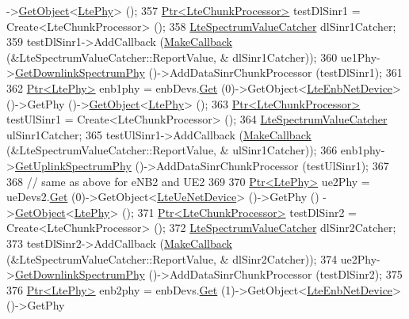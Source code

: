 \begin{DoxyCode}
      ->\hyperlink{classns3_1_1Object_a13e18c00017096c8381eb651d5bd0783}{GetObject}<\hyperlink{classns3_1_1LtePhy}{LtePhy}> ();
357   \hyperlink{classns3_1_1Ptr}{Ptr<LteChunkProcessor>} testDlSinr1 = Create<LteChunkProcessor> ();
358   \hyperlink{classns3_1_1LteSpectrumValueCatcher}{LteSpectrumValueCatcher} dlSinr1Catcher;
359   testDlSinr1->AddCallback (\hyperlink{group__makecallbackmemptr_ga9376283685aa99d204048d6a4b7610a4}{MakeCallback} (&LteSpectrumValueCatcher::ReportValue, &
      dlSinr1Catcher));
360   ue1Phy->\hyperlink{classns3_1_1LtePhy_a9560f8862545c7c5760e7f6737c5b938}{GetDownlinkSpectrumPhy} ()->AddDataSinrChunkProcessor (testDlSinr1);
361 
362   \hyperlink{classns3_1_1Ptr}{Ptr<LtePhy>} enb1phy = enbDevs.\hyperlink{classns3_1_1NetDeviceContainer_a677d62594b5c9d2dea155cc5045f4d0b}{Get} (0)->GetObject<\hyperlink{classns3_1_1LteEnbNetDevice}{LteEnbNetDevice}> ()->GetPhy
       ()->\hyperlink{classns3_1_1Object_a13e18c00017096c8381eb651d5bd0783}{GetObject}<\hyperlink{classns3_1_1LtePhy}{LtePhy}> ();
363   \hyperlink{classns3_1_1Ptr}{Ptr<LteChunkProcessor>} testUlSinr1 = Create<LteChunkProcessor> ();
364   \hyperlink{classns3_1_1LteSpectrumValueCatcher}{LteSpectrumValueCatcher} ulSinr1Catcher;
365   testUlSinr1->AddCallback (\hyperlink{group__makecallbackmemptr_ga9376283685aa99d204048d6a4b7610a4}{MakeCallback} (&LteSpectrumValueCatcher::ReportValue, &
      ulSinr1Catcher));
366   enb1phy->\hyperlink{classns3_1_1LtePhy_aa17612c41d80653ed556431eedef4304}{GetUplinkSpectrumPhy} ()->AddDataSinrChunkProcessor (testUlSinr1);
367 
368   \textcolor{comment}{// same as above for eNB2 and UE2}
369 
370   \hyperlink{classns3_1_1Ptr}{Ptr<LtePhy>} ue2Phy = ueDevs2.\hyperlink{classns3_1_1NetDeviceContainer_a677d62594b5c9d2dea155cc5045f4d0b}{Get} (0)->GetObject<\hyperlink{classns3_1_1LteUeNetDevice}{LteUeNetDevice}> ()->GetPhy ()
      ->\hyperlink{classns3_1_1Object_a13e18c00017096c8381eb651d5bd0783}{GetObject}<\hyperlink{classns3_1_1LtePhy}{LtePhy}> ();
371   \hyperlink{classns3_1_1Ptr}{Ptr<LteChunkProcessor>} testDlSinr2 = Create<LteChunkProcessor> ();
372   \hyperlink{classns3_1_1LteSpectrumValueCatcher}{LteSpectrumValueCatcher} dlSinr2Catcher;
373   testDlSinr2->AddCallback (\hyperlink{group__makecallbackmemptr_ga9376283685aa99d204048d6a4b7610a4}{MakeCallback} (&LteSpectrumValueCatcher::ReportValue, &
      dlSinr2Catcher));
374   ue2Phy->\hyperlink{classns3_1_1LtePhy_a9560f8862545c7c5760e7f6737c5b938}{GetDownlinkSpectrumPhy} ()->AddDataSinrChunkProcessor (testDlSinr2);
375 
376   \hyperlink{classns3_1_1Ptr}{Ptr<LtePhy>} enb2phy = enbDevs.\hyperlink{classns3_1_1NetDeviceContainer_a677d62594b5c9d2dea155cc5045f4d0b}{Get} (1)->GetObject<\hyperlink{classns3_1_1LteEnbNetDevice}{LteEnbNetDevice}> ()->GetPhy

\end{DoxyCode}

